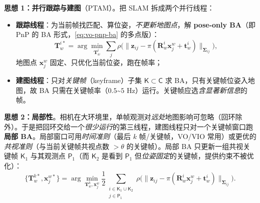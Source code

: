 \textbf{思想 1：并行跟踪与建图}（PTAM）。把 SLAM 拆成两个并行线程：
\begin{itemize}
  \item \textbf{跟踪线程}：为当前帧找匹配、算位姿，\emph{不更新地图点}，解 \textbf{pose-only BA}（即 PnP 的 BA 形式，\cref{eq:vo-pnp-ba} 的多点版）：
  \begin{equation}
    \mathbf{T}_w^{i*}=\arg\min_{\mathbf{T}_w^i}\sum_{j}\rho\!\Big(\big\|\mathbf{z}_{ij}-\pi(\mathbf{R}_w^i\mathbf{x}_j^w+\mathbf{t}_w^i)\big\|_{\boldsymbol{\Sigma}_{ij}}\Big),
    \label{eq:vo-poseonly-ba}
  \end{equation}
  地图点 $\mathbf{x}_j^w$ 固定、只优化当前位姿，跑在帧率；
  \item \textbf{建图线程}：只对\emph{关键帧}（keyframe）子集 $\mathsf{K}\subset\mathsf{C}$ 求 BA，只有关键帧位姿入地图，故 BA 只需在关键帧率（$0.5$\textasciitilde$5$ Hz）运行。关键帧应选\emph{含显著新信息}的帧。
\end{itemize}

\textbf{思想 2：局部性}。相机在大环境里，单帧观测对\emph{远处}地图影响可忽略（回环除外）\cite{carlone2026handbook}。于是把回环交给一个\emph{很少运行}的第三线程，建图线程只对一个关键帧窗口跑\textbf{局部 BA}。局部窗口可用\emph{时间准则}（最后 $k$ 帧/关键帧，VO/VIO 常用）或更优的\emph{共视准则}（与当前关键帧共视点数 $>\theta$ 的关键帧）。局部 BA 只更新一组共视关键帧 $\mathsf{K}_1$ 与其观测点 $\mathsf{P}_1$（而 $\mathsf{K}_2$ 是看到 $\mathsf{P}_1$ 但\emph{位姿固定}的关键帧，提供约束不被优化）：
\begin{equation}
  \{\mathbf{T}_w^{k*},\mathbf{x}_j^{w*}\}=\arg\min_{\mathbf{T}_w^k,\mathbf{x}_j^w}\frac12\!\!\sum_{\substack{i\in\mathsf{K}_1\cup\mathsf{K}_2\\ j\in\mathsf{P}_1}}\!\!\rho\!\Big(\big\|\mathbf{z}_{ij}-\pi(\mathbf{R}_w^i\mathbf{x}_j^w+\mathbf{t}_w^i)\big\|_{\boldsymbol{\Sigma}_{ij}}\Big).
  \label{eq:vo-local-ba}
\end{equation}

